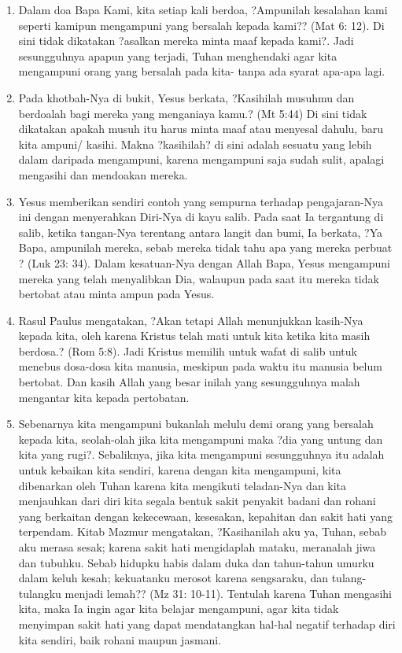 \documentclass[11pt,a5paper]{article}
\begin{document}
\begin{enumerate}
	\item Dalam doa Bapa Kami, kita setiap kali berdoa, ?Ampunilah kesalahan kami seperti kamipun mengampuni yang bersalah kepada kami?? (Mat 6: 12). Di sini tidak dikatakan ?asalkan mereka minta maaf kepada kami?. Jadi sesungguhnya apapun yang terjadi, Tuhan menghendaki agar kita mengampuni orang yang bersalah pada kita- tanpa ada syarat apa-apa lagi.
	\item Pada khotbah-Nya di bukit, Yesus berkata, ?Kasihilah musuhmu dan berdoalah bagi mereka yang menganiaya kamu.? (Mt 5:44) Di sini tidak dikatakan apakah musuh itu harus minta maaf atau menyesal dahulu, baru kita ampuni/ kasihi. Makna ?kasihilah? di sini adalah sesuatu yang lebih dalam daripada mengampuni, karena mengampuni saja sudah sulit, apalagi mengasihi dan mendoakan mereka.
	\item Yesus memberikan sendiri contoh yang sempurna terhadap pengajaran-Nya ini dengan menyerahkan Diri-Nya di kayu salib. Pada saat Ia tergantung di salib, ketika tangan-Nya terentang antara langit dan bumi, Ia berkata, ?Ya Bapa, ampunilah mereka, sebab mereka tidak tahu apa yang mereka perbuat ? (Luk 23: 34). Dalam kesatuan-Nya dengan Allah Bapa, Yesus mengampuni mereka yang telah menyalibkan Dia, walaupun pada saat itu mereka tidak bertobat atau minta ampun pada Yesus.
	\item Rasul Paulus mengatakan, ?Akan tetapi Allah menunjukkan kasih-Nya kepada kita, oleh karena Kristus telah mati untuk kita ketika kita masih berdosa.? (Rom 5:8). Jadi Kristus memilih untuk wafat di salib untuk menebus dosa-dosa kita manusia, meskipun pada waktu itu manusia belum bertobat. Dan kasih Allah yang besar inilah yang sesungguhnya malah mengantar kita kepada pertobatan.
	\item Sebenarnya kita mengampuni bukanlah melulu demi orang yang bersalah kepada kita, seolah-olah jika kita mengampuni maka ?dia yang untung dan kita yang rugi?. Sebaliknya, jika kita mengampuni sesungguhnya itu adalah untuk kebaikan kita sendiri, karena dengan kita mengampuni, kita dibenarkan oleh Tuhan karena kita mengikuti teladan-Nya dan kita menjauhkan dari diri kita segala bentuk sakit penyakit badani dan rohani yang berkaitan dengan kekecewaan, kesesakan, kepahitan dan sakit hati yang terpendam. Kitab Mazmur mengatakan, ?Kasihanilah aku ya, Tuhan, sebab aku merasa sesak; karena sakit hati mengidaplah mataku, meranalah jiwa dan tubuhku. Sebab hidupku habis dalam duka dan tahun-tahun umurku dalam keluh kesah; kekuatanku merosot karena sengsaraku, dan tulang-tulangku menjadi lemah?? (Mz 31: 10-11). Tentulah karena Tuhan mengasihi kita, maka Ia ingin agar kita belajar mengampuni, agar kita tidak menyimpan sakit hati yang dapat mendatangkan hal-hal negatif terhadap diri kita sendiri, baik rohani maupun jasmani.
\end{enumerate}
\end{document}
